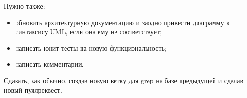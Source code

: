 \documentclass[a5paper]{homework}
\begin{document}
Нужно также:

\begin{itemize}
    \item обновить архитектурную документацию и заодно привести диаграмму к синтаксису UML, если она ему не соответствует;
    \item написать юнит-тесты на новую функциональность;
    \item написать комментарии.
\end{itemize}

Сдавать, как обычно, создав новую ветку для grep на базе предыдущей и сделав новый пуллреквест.
\end{document}
